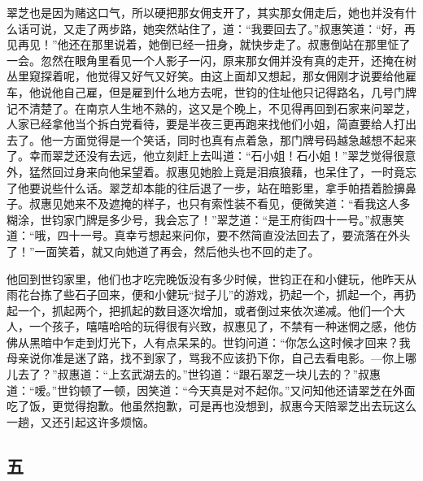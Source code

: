 \par 翠芝也是因为赌这口气，所以硬把那女佣支开了，其实那女佣走后，她也并没有什么话可说，又走了两步路，她突然站住了，道：“我要回去了。”叔惠笑道：“好，再见再见！”他还在那里说着，她倒已经一扭身，就快步走了。叔惠倒站在那里怔了一会。忽然在眼角里看见一个人影子一闪，原来那女佣并没有真的走开，还掩在树丛里窥探着呢，他觉得又好气又好笑。由这上面却又想起，那女佣刚才说要给他雇车，他说他自己雇，但是雇到什么地方去呢，世钧的住址他只记得路名，几号门牌记不清楚了。在南京人生地不熟的，这又是个晚上，不见得再回到石家来问翠芝，人家已经拿他当个拆白党看待，要是半夜三更再跑来找他们小姐，简直要给人打出去了。他一方面觉得是一个笑话，同时也真有点着急，那门牌号码越急越想不起来了。幸而翠芝还没有去远，他立刻赶上去叫道：“石小姐！石小姐！”翠芝觉得很意外，猛然回过身来向他呆望着。叔惠见她脸上竟是泪痕狼藉，也呆住了，一时竟忘了他要说些什么话。翠芝却本能的往后退了一步，站在暗影里，拿手帕捂着脸擤鼻子。叔惠见她来不及遮掩的样子，也只有索性装不看见，便微笑道：“看我这人多糊涂，世钧家门牌是多少号，我会忘了！”翠芝道：“是王府街四十一号。”叔惠笑道：“哦，四十一号。真幸亏想起来问你，要不然简直没法回去了，要流落在外头了！”一面笑着，就又向她道了再会，然后他头也不回的走了。
\par 他回到世钧家里，他们也才吃完晚饭没有多少时候，世钧正在和小健玩，他昨天从雨花台拣了些石子回来，便和小健玩“挝子儿”的游戏，扔起一个，抓起一个，再扔起一个，抓起两个，把抓起的数目逐次增加，或者倒过来依次递减。他们一个大人，一个孩子，嘻嘻哈哈的玩得很有兴致，叔惠见了，不禁有一种迷惘之感，他仿佛从黑暗中乍走到灯光下，人有点呆呆的。世钧问道：“你怎么这时候才回来？我母亲说你准是迷了路，找不到家了，骂我不应该扔下你，自己去看电影。—你上哪儿去了？”叔惠道：“上玄武湖去的。”世钧道：“跟石翠芝一块儿去的？”叔惠道：“嗳。”世钧顿了一顿，因笑道：“今天真是对不起你。”又问知他还请翠芝在外面吃了饭，更觉得抱歉。他虽然抱歉，可是再也没想到，叔惠今天陪翠芝出去玩这么一趟，又还引起这许多烦恼。


\subsection{五}

